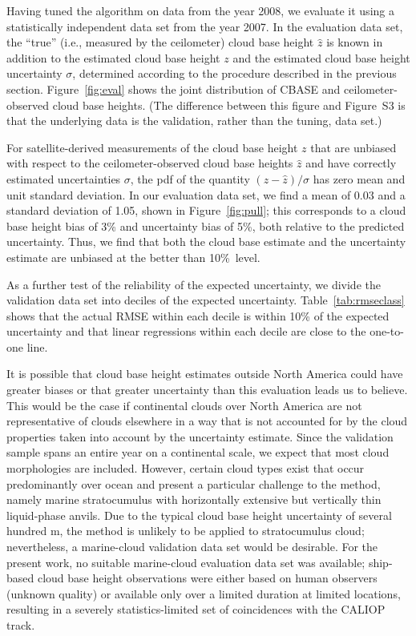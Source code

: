 \documentclass[amt,manuscript]{copernicus}\usepackage[]{graphicx}\usepackage[]{color}
\begin{document}
Having tuned the algorithm on data from the year 2008, we evaluate it using a
statistically independent data set from the year 2007.  In the evaluation data
set, the ``true'' (i.e., measured by the ceilometer) cloud base height $\hat{z}$
is known in addition to the estimated cloud base height $z$ and the estimated
cloud base height uncertainty $\sigma$, determined according to the procedure
described in the previous section.  Figure~\ref{fig:eval} shows the joint
distribution of CBASE and ceilometer-observed cloud base heights.  (The
difference between this figure and Figure~S3 is that the underlying data is the
validation, rather than the tuning, data set.)

For satellite-derived measurements of the cloud base height $z$ that are
unbiased with respect to the ceilometer-observed cloud base heights $\hat{z}$
and have correctly estimated uncertainties $\sigma$, the pdf of the quantity
$(z - \hat{z})/\sigma$ has zero mean and unit standard deviation. In our
evaluation data set, we find a mean of 0.03 and a standard deviation of 1.05, shown in Figure~\ref{fig:pull}; this
corresponds to a cloud base height bias of %
3\%
and uncertainty bias of %
5\%, both relative to the predicted uncertainty.  Thus, we find that both
the cloud base estimate and the uncertainty estimate are unbiased at the better
than 10\%\ level.

As a further test of the reliability of the expected uncertainty, we divide the
validation data set into deciles of the expected uncertainty.
Table~\ref{tab:rmseclass} shows that the actual RMSE within each decile is
within 10\% of the expected uncertainty and that linear regressions within each
decile are close to the one-to-one line.

It is possible that cloud base height estimates outside North America could have
greater biases or that greater uncertainty than this evaluation leads us to
believe.  This would be the case if continental clouds over North America are
not representative of clouds elsewhere in a way that is not accounted for by the
cloud properties taken into account by the uncertainty estimate.  Since the
validation sample spans an entire year on a continental scale, we expect that
most cloud morphologies are included.  However, certain cloud types exist that
occur predominantly over ocean and present a particular challenge to the method,
namely marine stratocumulus with horizontally extensive but vertically thin
liquid-phase anvils.  Due to the typical cloud base height uncertainty of
several hundred m, the method is unlikely to be applied to stratocumulus cloud;
nevertheless, a marine-cloud validation data set would be desirable.  For the
present work, no suitable marine-cloud evaluation data set was available;
ship-based cloud base height observations were either based on human observers
(unknown quality) or available only over a limited duration at limited
locations, resulting in a severely statistics-limited set of coincidences with
the CALIOP track.
\end{document}
